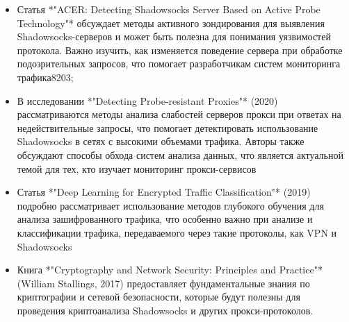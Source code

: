 \documentclass[a4paper,12pt]{article}
\begin{document}
\begin{itemize}
    \item Статья *"ACER: Detecting Shadowsocks Server Based on Active Probe Technology"* обсуждает методы активного зондирования для выявления Shadowsocks-серверов и может быть полезна для понимания уязвимостей протокола. Важно изучить, как изменяется поведение сервера при обработке подозрительных запросов, что помогает разработчикам систем мониторинга трафика8203;
    \item В исследовании *"Detecting Probe-resistant Proxies"* (2020) рассматриваются методы анализа слабостей серверов прокси при ответах на недействительные запросы, что помогает детектировать использование Shadowsocks в сетях с высокими объемами трафика. Авторы также обсуждают способы обхода систем анализа данных, что является актуальной темой для тех, кто изучает мониторинг прокси-сервисов
    \item Статья *"Deep Learning for Encrypted Traffic Classification"* (2019) подробно рассматривает использование методов глубокого обучения для анализа зашифрованного трафика, что особенно важно при анализе и классификации трафика, передаваемого через такие протоколы, как VPN и Shadowsocks
    \item Книга *"Cryptography and Network Security: Principles and Practice"* (William Stallings, 2017) предоставляет фундаментальные знания по криптографии и сетевой безопасности, которые будут полезны для проведения криптоанализа Shadowsocks и других прокси-протоколов.
\end{itemize}
\end{document}
